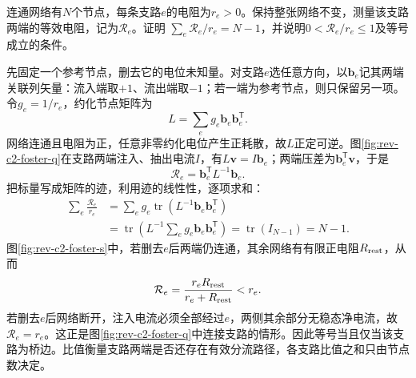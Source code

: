 \begin{exercise}[各支路有效电阻的加权和（选做）]\label{ex:rev-c2-foster}
连通网络有$N$个节点，每条支路$e$的电阻为$r_e>0$。保持整张网络不变，测量该支路两端的等效电阻，记为$\mathcal R_e$。证明
$\sum_e\mathcal R_e/r_e=N-1$，并说明$0<\mathcal R_e/r_e\le1$及等号成立的条件。
\end{exercise}
\begin{solution}
先固定一个参考节点，删去它的电位未知量。对支路$e$选任意方向，以$\boldsymbol b_e$记其两端关联列矢量：流入端取$+1$、流出端取$-1$；若一端为参考节点，则只保留另一项。令$g_e=1/r_e$，约化节点矩阵为
\[
 L=\sum_e g_e\boldsymbol b_e\boldsymbol b_e^{\mathsf T}.
\]
网络连通且电阻为正，任意非零约化电位产生正耗散，故$L$正定可逆。图\ref{fig:rev-c2-foster-q}在支路两端注入、抽出电流$I$，有$L\boldsymbol v=I\boldsymbol b_e$；两端压差为$\boldsymbol b_e^{\mathsf T}\boldsymbol v$，于是
\[
 \mathcal R_e=\boldsymbol b_e^{\mathsf T}L^{-1}\boldsymbol b_e.
\]
把标量写成矩阵的迹，利用迹的线性性，逐项求和：
\begin{align*}
 \sum_e\frac{\mathcal R_e}{r_e}
 &=\sum_e g_e\operatorname{tr}(L^{-1}\boldsymbol b_e\boldsymbol b_e^{\mathsf T})\\
 &=\operatorname{tr}\!\left(L^{-1}\sum_e g_e\boldsymbol b_e\boldsymbol b_e^{\mathsf T}\right)
 =\operatorname{tr}(I_{N-1})=N-1.
\end{align*}
图\ref{fig:rev-c2-foster-s}中，若删去$e$后两端仍连通，其余网络有有限正电阻$R_{\rm rest}$，从而
\[
 \mathcal R_e=\frac{r_eR_{\rm rest}}{r_e+R_{\rm rest}}<r_e.
\]
若删去$e$后网络断开，注入电流必须全部经过$e$，两侧其余部分无稳态净电流，故$\mathcal R_e=r_e$。这正是图\ref{fig:rev-c2-foster-q}中连接支路的情形。因此等号当且仅当该支路为桥边。比值衡量支路两端是否还存在有效分流路径，各支路比值之和只由节点数决定。
\end{solution}
